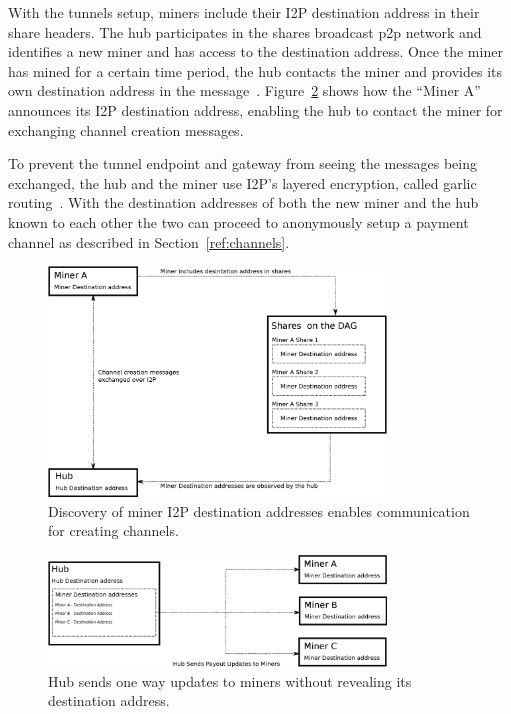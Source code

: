 \documentclass{article}
\begin{document}
With the tunnels setup, miners include their I2P destination address
in their share headers. The hub participates in the shares broadcast
p2p network and identifies a new miner and has access to the
destination address. Once the miner has mined for a certain time
period, the hub contacts the miner and provides its own destination
address in the
message~\cite{i2p-streaming-library}. Figure~\ref{fig:new-miner-communication}
shows how the ``Miner A'' announces its I2P destination address,
enabling the hub to contact the miner for exchanging channel creation
messages.

To prevent the tunnel endpoint and gateway from seeing the messages
being exchanged, the hub and the miner use I2P's layered encryption,
called garlic routing~\cite{i2p-garlic-routing}. With the destination
addresses of both the new miner and the hub known to each other the
two can proceed to anonymously setup a payment channel as described in
Section~\ref{ref:channels}.

\begin{figure}
  \begin{center}
    \includegraphics[width=0.8\textwidth]{new-miner-communication.eps}
    \caption{Discovery of miner I2P destination addresses enables
      communication for creating channels.}\label{fig:new-miner-communication}
  \end{center}
\end{figure}

\begin{figure}
  \begin{center}
    \includegraphics[width=0.8\textwidth]{payout-communication.eps}
    \caption{Hub sends one way updates to miners without revealing its
      destination address.}\label{fig:new-miner-communication}
  \end{center}
\end{figure}
\end{document}
